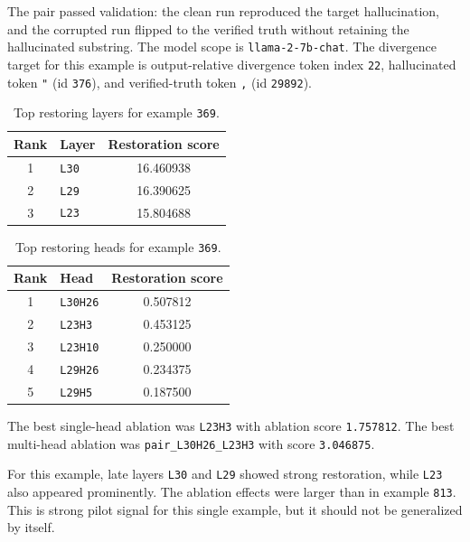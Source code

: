 \documentclass[11pt]{article}
\begin{document}
The pair passed validation: the clean run reproduced the target hallucination, and the corrupted run flipped to the verified truth without retaining the hallucinated substring. The model scope is \texttt{llama-2-7b-chat}. The divergence target for this example is output-relative divergence token index \texttt{22}, hallucinated token \texttt{"} (id \texttt{376}), and verified-truth token \texttt{,} (id \texttt{29892}).

\begin{table}[t]
\caption{Top restoring layers for example \texttt{369}.}
\centering
\small
\begin{tabular}{clc}
\toprule
\textbf{Rank} & \textbf{Layer} & \textbf{Restoration score} \\
\midrule
1 & \texttt{L30} & 16.460938 \\
2 & \texttt{L29} & 16.390625 \\
3 & \texttt{L23} & 15.804688 \\
\bottomrule
\end{tabular}

\label{tab:369-layers}
\end{table}

\begin{table}[t]
\caption{Top restoring heads for example \texttt{369}.}
\centering
\small
\begin{tabular}{clc}
\toprule
\textbf{Rank} & \textbf{Head} & \textbf{Restoration score} \\
\midrule
1 & \texttt{L30H26} & 0.507812 \\
2 & \texttt{L23H3} & 0.453125 \\
3 & \texttt{L23H10} & 0.250000 \\
4 & \texttt{L29H26} & 0.234375 \\
5 & \texttt{L29H5} & 0.187500 \\
\bottomrule
\end{tabular}
\label{tab:369-heads}
\end{table}

The best single-head ablation was \texttt{L23H3} with ablation score \texttt{1.757812}. The best multi-head ablation was \texttt{pair\_L30H26\_L23H3} with score \texttt{3.046875}.

For this example, late layers \texttt{L30} and \texttt{L29} showed strong restoration, while \texttt{L23} also appeared prominently. The ablation effects were larger than in example \texttt{813}. This is strong pilot signal for this single example, but it should not be generalized by itself.
\end{document}
